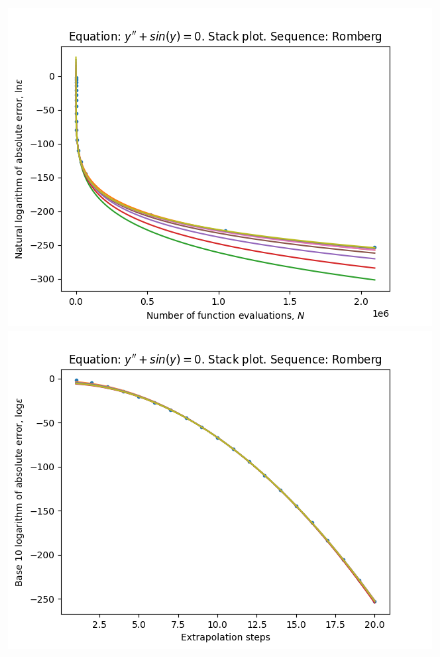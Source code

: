 \begin{figure}[H]
\centering
\begin{minipage}{0.45\textwidth}
\centering
\includegraphics[scale=0.45]{emr_plots/oscillation_hp_romberg_stack.png}
\end{minipage}
\begin{minipage}{0.45\textwidth}
\centering
\includegraphics[scale=0.45]{emr_plots/oscillation_hp_romberg_steps_stack.png}
\end{minipage}
\end{figure}

